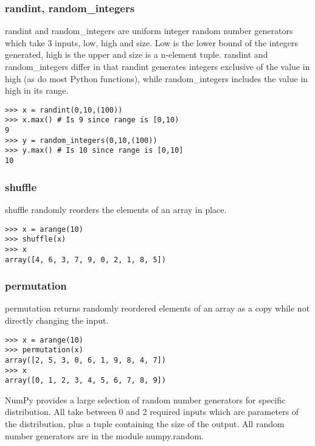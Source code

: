 \documentclass[KSmain.tex]{subfiles}
\begin{document}
\subsubsection{randint, random\_integers}
randint and random_integers are uniform integer random number generators which take 3 inputs, low,
high and size. Low is the lower bound of the integers generated, high is the upper and size is a n-element
tuple. randint and random\_integers differ in that randint generates integers exclusive of the value in high
(as do most Python functions), while random_integers includes the value in high in its range.
\begin{framed}
\begin{verbatim}
>>> x = randint(0,10,(100))
>>> x.max() # Is 9 since range is [0,10)
9
>>> y = random_integers(0,10,(100))
>>> y.max() # Is 10 since range is [0,10]
10
\end{verbatim}
\end{framed}
\subsubsection{shuffle}
shuffle randomly reorders the elements of an array in place.
\begin{framed}
\begin{verbatim}
>>> x = arange(10)
>>> shuffle(x)
>>> x
array([4, 6, 3, 7, 9, 0, 2, 1, 8, 5])
\end{verbatim}
\end{framed}
\subsubsection{permutation}
permutation returns randomly reordered elements of an array as a copy while not directly changing the
input.
\begin{framed}
\begin{verbatim}
>>> x = arange(10)
>>> permutation(x)
array([2, 5, 3, 0, 6, 1, 9, 8, 4, 7])
>>> x
array([0, 1, 2, 3, 4, 5, 6, 7, 8, 9])
\end{verbatim}
\end{framed}
NumPy provides a large selection of random number generators for specific distribution. All take between
0 and 2 required inputs which are parameters of the distribution, plus a tuple containing the size of the
output. All random number generators are in the module numpy.random.
%

\end{document}
